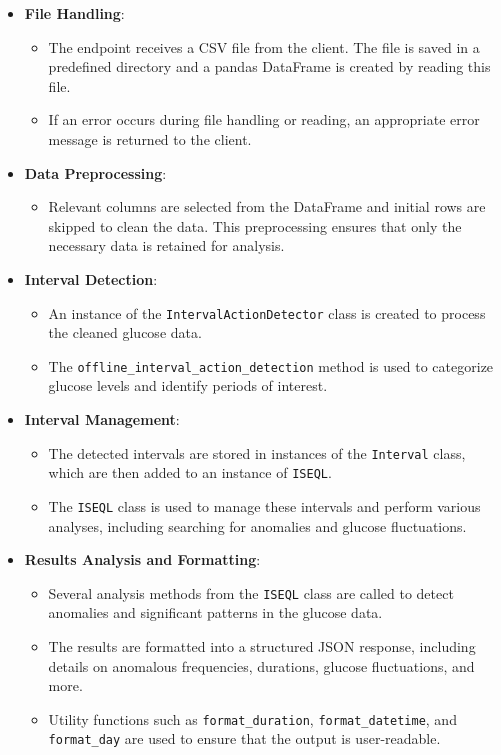 \documentclass{article}
\begin{document}
\begin{itemize}
    \item \textbf{File Handling}:
    \begin{itemize}
        \item The endpoint receives a CSV file from the client. The file is saved in a predefined directory and a pandas DataFrame is created by reading this file.
        \item If an error occurs during file handling or reading, an appropriate error message is returned to the client.
    \end{itemize}
    
    \item \textbf{Data Preprocessing}:
    \begin{itemize}
        \item Relevant columns are selected from the DataFrame and initial rows are skipped to clean the data. This preprocessing ensures that only the necessary data is retained for analysis.
    \end{itemize}
    
    \item \textbf{Interval Detection}:
    \begin{itemize}
        \item An instance of the \texttt{IntervalActionDetector} class is created to process the cleaned glucose data.
        \item The \texttt{offline\_interval\_action\_detection} method is used to categorize glucose levels and identify periods of interest.
    \end{itemize}
    
    \item \textbf{Interval Management}:
    \begin{itemize}
        \item The detected intervals are stored in instances of the \texttt{Interval} class, which are then added to an instance of \texttt{ISEQL}.
        \item The \texttt{ISEQL} class is used to manage these intervals and perform various analyses, including searching for anomalies and glucose fluctuations.
    \end{itemize}
    
    \item \textbf{Results Analysis and Formatting}:
    \begin{itemize}
        \item Several analysis methods from the \texttt{ISEQL} class are called to detect anomalies and significant patterns in the glucose data.
        \item The results are formatted into a structured JSON response, including details on anomalous frequencies, durations, glucose fluctuations, and more.
        \item Utility functions such as \texttt{format\_duration}, \texttt{format\_datetime}, and \texttt{format\_day} are used to ensure that the output is user-readable.
    \end{itemize}
    

\end{itemize}
\end{document}
